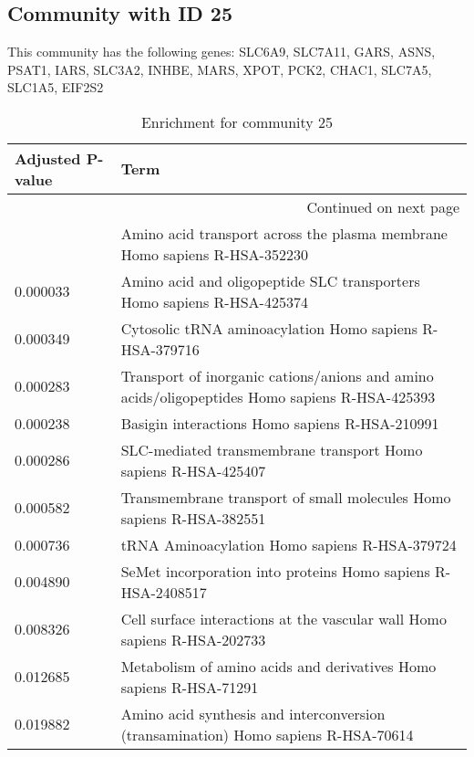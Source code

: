 \subsection*{Community with ID 25}
This community has the following genes: SLC6A9, SLC7A11, GARS, ASNS, PSAT1, IARS, SLC3A2, INHBE, MARS, XPOT, PCK2, CHAC1, SLC7A5, SLC1A5, EIF2S2
\\
\begin{longtable}{p{2.4cm}p{14.5cm}}
\caption{Enrichment for community 25}\\
\toprule
Adjusted \newline P-value &                                                                                           Term \\
\midrule
\endhead
\midrule
\multicolumn{2}{r}{{Continued on next page}} \\
\midrule
\endfoot

\bottomrule
\endlastfoot
                 0.000010 &                      Amino acid transport across the plasma membrane Homo sapiens R-HSA-352230 \\
                 0.000033 &                         Amino acid and oligopeptide SLC transporters Homo sapiens R-HSA-425374 \\
                 0.000349 &                                        Cytosolic tRNA aminoacylation Homo sapiens R-HSA-379716 \\
                 0.000283 &  Transport of inorganic cations/anions and amino acids/oligopeptides Homo sapiens R-HSA-425393 \\
                 0.000238 &                                                 Basigin interactions Homo sapiens R-HSA-210991 \\
                 0.000286 &                                 SLC-mediated transmembrane transport Homo sapiens R-HSA-425407 \\
                 0.000582 &                           Transmembrane transport of small molecules Homo sapiens R-HSA-382551 \\
                 0.000736 &                                                  tRNA Aminoacylation Homo sapiens R-HSA-379724 \\
                 0.004890 &                                   SeMet incorporation into proteins Homo sapiens R-HSA-2408517 \\
                 0.008326 &                       Cell surface interactions at the vascular wall Homo sapiens R-HSA-202733 \\
                 0.012685 &                             Metabolism of amino acids and derivatives Homo sapiens R-HSA-71291 \\
                 0.019882 &             Amino acid synthesis and interconversion (transamination) Homo sapiens R-HSA-70614 \\
\end{longtable}


